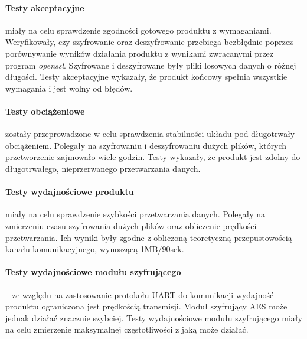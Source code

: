 \paragraph{Testy akceptacyjne} miały na celu sprawdzenie zgodności gotowego produktu z wymaganiami. Weryfikowały, czy szyfrowanie oraz deszyfrowanie przebiega bezbłędnie poprzez porównywanie wyników działania produktu z wynikami zwracanymi przez program \textit{openssl}. Szyfrowane i deszyfrowane były pliki losowych danych o różnej długości. Testy akceptacyjne wykazały, że  produkt końcowy spełnia wszystkie wymagania i jest wolny od błędów.

\paragraph{Testy obciążeniowe} zostały przeprowadzone w celu sprawdzenia stabilności układu pod długotrwały obciążeniem. Polegały na szyfrowaniu i deszyfrowaniu dużych plików, których przetworzenie zajmowało wiele godzin. Testy wykazały, że produkt jest zdolny do długotrwałego, nieprzerwanego przetwarzania danych.

\paragraph{Testy wydajnościowe produktu} miały na celu sprawdzenie szybkości przetwarzania danych. Polegały na zmierzeniu czasu szyfrowania dużych plików oraz obliczenie prędkości przetwarzania. Ich wyniki były zgodne z obliczoną teoretyczną przepustowością kanału komunikacyjnego, wynoszącą 1MB/90sek.

\paragraph{Testy wydajnościowe modułu szyfrującego} -- ze względu na zastosowanie protokołu UART do komunikacji wydajność produktu ograniczona jest prędkością transmisji. Moduł szyfrujący AES może jednak działać znacznie szybciej. Testy wydajnościowe modułu szyfrującego miały na celu zmierzenie maksymalnej częstotliwości z jaką może działać.

